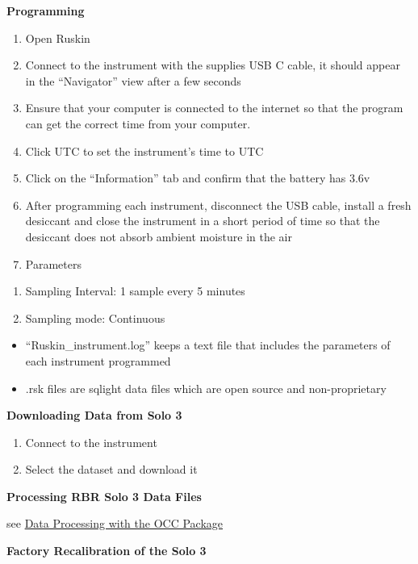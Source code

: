 \documentclass[]{book}
\begin{document}
\textbf{Programming}

\begin{enumerate}
\def\labelenumi{\arabic{enumi}.}
\item
  Open Ruskin
\item
  Connect to the instrument with the supplies USB C cable, it should appear in the ``Navigator'' view after a few seconds
\item
  Ensure that your computer is connected to the internet so that the program can get the correct time from your computer.
\item
  Click UTC to set the instrument's time to UTC
\item
  Click on the ``Information'' tab and confirm that the battery has 3.6v
\item
  After programming each instrument, disconnect the USB cable, install a fresh desiccant and close the instrument in a short period of time so that the desiccant does not absorb ambient moisture in the air
\item
  Parameters
\end{enumerate}

\begin{enumerate}
\def\labelenumi{\alph{enumi}.}
\item
  Sampling Interval: 1 sample every 5 minutes
\item
  Sampling mode: Continuous
\end{enumerate}

\begin{itemize}
\item
  ``Ruskin\_instrument.log'' keeps a text file that includes the parameters of each instrument programmed
\item
  .rsk files are sqlight data files which are open source and non-proprietary
\end{itemize}

\textbf{Downloading Data from Solo 3}

\begin{enumerate}
\def\labelenumi{\arabic{enumi}.}
\item
  Connect to the instrument
\item
  Select the dataset and download it
\end{enumerate}

\textbf{Processing RBR Solo 3 Data Files}

see \protect\hyperlink{data_processing}{Data Processing with the OCC Package}

\textbf{Factory Recalibration of the Solo 3}
\end{document}
